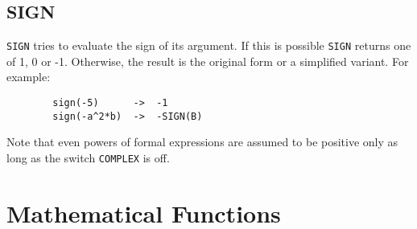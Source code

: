 \subsection{SIGN}
\hypertarget{operator:SIGN}{}
\texttt{SIGN} tries to evaluate the sign of its argument. If this
is possible \texttt{SIGN} returns one of 1, 0 or -1.  Otherwise, the result
is the original form or a simplified variant. For example:
\begin{verbatim}
        sign(-5)      ->  -1
        sign(-a^2*b)  ->  -SIGN(B)
\end{verbatim}
Note that even powers of formal expressions are assumed to be
positive only as long as the switch \texttt{COMPLEX} is off.

\section{Mathematical Functions}
\hypertarget{operator:ACOS}{}
\hypertarget{operator:ACOSH}{}
\hypertarget{operator:ACOT}{}
\hypertarget{operator:ACOTH}{}
\hypertarget{operator:ACSC}{}
\hypertarget{operator:ACSCH}{}
\hypertarget{operator:ASEC}{}
\hypertarget{operator:ASECH}{}
\hypertarget{operator:ASIN}{}
\hypertarget{operator:ASINH}{}
\hypertarget{operator:ATAN}{}
\hypertarget{operator:ATANH}{}
\hypertarget{operator:ATAN2}{}
\hypertarget{operator:COS}{}
\hypertarget{operator:COSH}{}
\hypertarget{operator:COT}{}
\hypertarget{operator:COTH}{}
\hypertarget{operator:CSC}{}
\hypertarget{operator:CSCH}{}
\hypertarget{operator:EXP}{}
\hypertarget{operator:HYPOT}{}
\hypertarget{operator:LOG}{}
\hypertarget{operator:LN}{}
\hypertarget{operator:LOGB}{}
\hypertarget{operator:LOG10}{}
\hypertarget{operator:SEC}{}
\hypertarget{operator:SECH}{}
\hypertarget{operator:SIN}{}
\hypertarget{operator:SINH}{}
\hypertarget{operator:SQRT}{}
\hypertarget{operator:TAN}{}
\hypertarget{operator:TANH}{}

